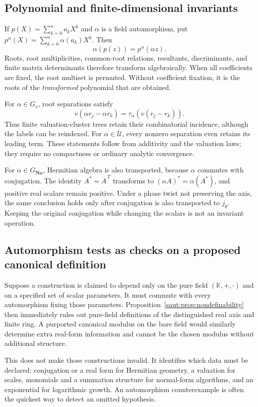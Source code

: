 \documentclass[11pt]{article}
\theoremstyle{definition}
\theoremstyle{remark}
\newcommand{\No}{\mathbf{No}}
\newcommand{\K}{\mathbb K}
\newcommand{\U}{\mathcal U}
\numberwithin{equation}{section}
\begin{document}
\subsection{Polynomial and finite-dimensional invariants}

If $p(X)=\sum_{k=0}^n a_kX^k$ and $\alpha$ is a field automorphism, put
$p^\alpha(X)=\sum_{k=0}^n\alpha(a_k)X^k$. Then
\[
 \alpha(p(z))=p^\alpha(\alpha z).
\]
Roots, root multiplicities, common-root relations, resultants,
discriminants, and finite matrix determinants therefore transform
algebraically. When all coefficients are fixed, the root multiset is
permuted. Without coefficient fixation, it is the roots of the
\emph{transformed} polynomial that are obtained.

For $\alpha\in G_v$, root separations satisfy
\[
 v(\alpha r_j-\alpha r_k)=\tau_\alpha(v(r_j-r_k)).
\]
Thus finite valuation-cluster trees retain their combinatorial incidence,
although the labels can be reindexed. For $\alpha\in\U$, every nonzero
separation even retains its leading term. These statements follow from
additivity and the valuation laws; they require no compactness or ordinary
analytic convergence.

For $\alpha\in G_{\No}$, Hermitian algebra is also transported, because
$\alpha$ commutes with conjugation. The identity
$A^*=\overline A^{\,T}$ transforms to $(\alpha A)^*=\alpha(A^*)$,
and positive real scalars remain positive. Under a phase twist not
preserving the axis, the same conclusion holds only after conjugation is
also transported to $j_\theta$. Keeping the original conjugation while
changing the scalars is not an invariant operation.

\subsection{Automorphism tests as checks on a proposed canonical definition}

Suppose a construction is claimed to depend only on the pure field
$(\K,+,\cdot)$ and on a specified set of scalar parameters. It must commute
with every automorphism fixing those parameters. Proposition~\ref{saut:prop:nondefinability}
then immediately rules out pure-field definitions of the distinguished
real axis and finite ring. A purported canonical modulus on the bare
field would similarly determine extra real-form information and cannot
be the chosen modulus without additional structure.

This does not make those constructions invalid. It identifies which data
must be declared: conjugation or a real form for Hermitian geometry,
a valuation for scales, monomials and a summation structure for normal-form
algorithms, and an exponential for logarithmic growth. An automorphism
counterexample is often the quickest way to detect an omitted hypothesis.
\end{document}

